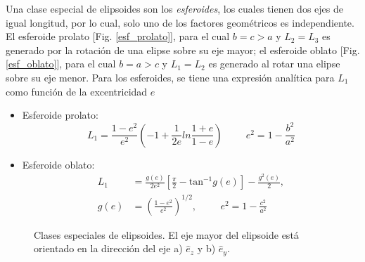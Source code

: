 Una clase especial de elipsoides son los \textit{esferoides}, los cuales tienen dos ejes de igual longitud, por lo cual, solo uno de los factores geométricos es independiente. El esferoide prolato [Fig. \ref{esf_prolato}], para el cual $b=c>a$ y $L_2=L_3$ es generado por la rotación de una elipse sobre su eje mayor; el esferoide oblato [Fig.\ref{esf_oblato}], para el cual $b=a>c$ y $L_1=L_2$ es generado al rotar una elipse sobre su eje menor. Para los esferoides, se tiene una expresión analítica para $L_1$ como función de la excentricidad $e$ \cite{Bohren}
\begin{itemize}
    \item Esferoide prolato:
    \begin{equation}
        L_1=\frac{1-e^2}{e^2}\left(-1+\frac{1}{2e}ln\frac{1+e}{1-e}\right)\hspace{1cm}e^2=1-\frac{b^2}{a^2}
    \end{equation}
    \item Esferoide oblato:
    \begin{align}
        L_1&=\frac{g(e)}{2e^2}\left[\frac{\pi}{2}-\mbox{tan}^{-1}g(e)\right]-\frac{g^2(e)}{2},\\
        g(e)&=\left(\frac{1-e^2}{e^2}\right)^{1/2},\hspace{1cm}e^2=1-\frac{c^2}{a^2}
    \end{align}
\end{itemize}
\begin{figure}[h!]
	\centering
	\caption{Clases especiales de elipsoides. El eje mayor del elipsoide está orientado en la dirección del eje a) $\hat{e}_z$ y b) $\hat{e}_y$.}
\end{figure}

